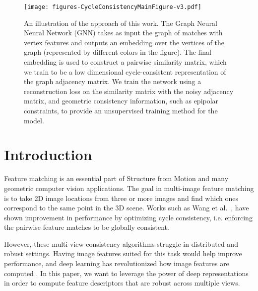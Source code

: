 \documentclass[10pt,twocolumn,letterpaper]{article}
\begin{document}
\begin{figure}[t]
\begin{center}
  \texttt{[image: figures-CycleConsistencyMainFigure-v3.pdf]}
\end{center}
  \caption{
    An illustration of the approach of this work.
    The Graph Neural Neural Network (GNN) \cite{battaglia2018relational} takes as input the graph of matches with vertex features and outputs an embedding over the vertices of the graph (represented by different colors in the figure).
    The final embedding is used to construct a pairwise similarity matrix, which we train to be a low dimensional cycle-consistent representation of the graph adjacency matrix.
    We train the network using a reconstruction loss on the similarity matrix with the noisy adjacency matrix, and geometric consistency information, such as epipolar constraints, to provide an unsupervised training method for the model.
  }
\label{fig:pipeline}
\end{figure}

\section{Introduction}
Feature matching is an essential part of Structure from Motion and many geometric computer vision applications.
The goal in multi-image feature matching is to take 2D image locations from three or more images and find which ones correspond to the same point in the 3D scene.
Works such as Wang et al.~\cite{wang2017multi}, have shown improvement in performance by optimizing cycle consistency, i.e. enforcing the pairwise feature matches to be globally consistent.

However, these multi-view consistency algorithms struggle in distributed and robust settings.
Having image features suited for this task would help improve performance, and deep learning has revolutionized how image features are computed \cite{yi2016lift}.
In this paper, we want to leverage the power of deep representations in order to compute feature descriptors that are robust across multiple views.
\end{document}
